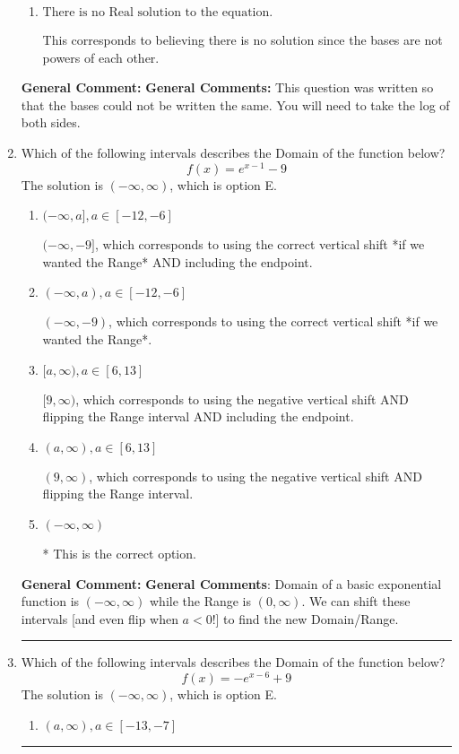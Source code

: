 \documentclass{extbook}[14pt]
\newcommand{\litem}[1]{\item #1

\rule{\textwidth}{0.4pt}}
\begin{document}
\begin{enumerate}
{\begin{enumerate}[label=\Alph*.]
$x = 1.000$, which corresponds to solving the numerators as equal while ignoring the bases are different.
\item \( \text{There is no Real solution to the equation.} \)

This corresponds to believing there is no solution since the bases are not powers of each other.
\end{enumerate}

\textbf{General Comment:} \textbf{General Comments:} This question was written so that the bases could not be written the same. You will need to take the log of both sides.
}
\litem{
Which of the following intervals describes the Domain of the function below?
\[ f(x) = e^{x-1}-9 \]
The solution is \( (-\infty, \infty) \), which is option E.\begin{enumerate}[label=\Alph*.]
\item \( (-\infty, a], a \in [-12, -6] \)

$(-\infty, -9]$, which corresponds to using the correct vertical shift *if we wanted the Range* AND including the endpoint.
\item \( (-\infty, a), a \in [-12, -6] \)

$(-\infty, -9)$, which corresponds to using the correct vertical shift *if we wanted the Range*.
\item \( [a, \infty), a \in [6, 13] \)

$[9, \infty)$, which corresponds to using the negative vertical shift AND flipping the Range interval AND including the endpoint.
\item \( (a, \infty), a \in [6, 13] \)

$(9, \infty)$, which corresponds to using the negative vertical shift AND flipping the Range interval.
\item \( (-\infty, \infty) \)

* This is the correct option.
\end{enumerate}

\textbf{General Comment:} \textbf{General Comments}: Domain of a basic exponential function is $(-\infty, \infty)$ while the Range is $(0, \infty)$. We can shift these intervals [and even flip when $a<0$!] to find the new Domain/Range.
}
\litem{
Which of the following intervals describes the Domain of the function below?
\[ f(x) = -e^{x-6}+9 \]
The solution is \( (-\infty, \infty) \), which is option E.\begin{enumerate}[label=\Alph*.]
\item \( (a, \infty), a \in [-13, -7] \)


\end{enumerate}}
\end{enumerate}
\end{document}

